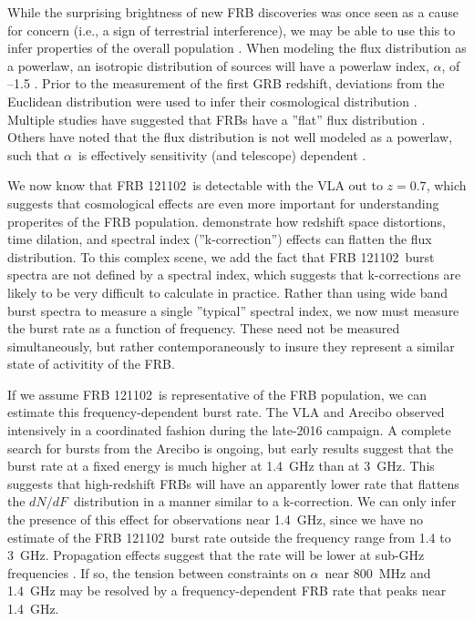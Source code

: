 \documentclass[twocolumn]{aastex61}
\newcommand{\frb}{FRB 121102}
\begin{document}
While the surprising brightness of new FRB discoveries was once seen as a cause for concern (i.e., a sign of terrestrial interference), we may be able to use this to infer properties of the overall population \citep{2007Sci...318..777L, 2016arXiv161105758R}. When modeling the flux distribution as a powerlaw, an isotropic distribution of sources will have a powerlaw index, $\alpha$, of --1.5 \citep[the ''Euclidean distribution'';][]{2016MNRAS.462..941L}. Prior to the measurement of the first GRB redshift, deviations from the Euclidean distribution were used to infer their cosmological distribution \citep[e.g., the $V/V_{\rm{max}}$\ test;][]{1992ApJ...388L..45M, 1995ApJ...453...25F}. Multiple studies have suggested that FRBs have a ''flat'' flux distribution \citep[$-0.5<\alpha<-0.9$;][]{2016ApJ...830...75V, 2016arXiv160206099L, 2016arXiv161100458L}. Others have noted that the flux distribution is not well modeled as a powerlaw, such that $\alpha$\ is effectively sensitivity (and telescope) dependent \citep{2016MNRAS.461..984O, 2017arXiv170208040C}.

We now know that \frb\ is detectable with the VLA out to $z=0.7$, which suggests that cosmological effects are even more important for understanding properites of the FRB population. \citet{2017arXiv170208040C} demonstrate how redshift space distortions, time dilation, and spectral index (''k-correction'') effects can flatten the flux distribution. To this complex scene, we add the fact that \frb\ burst spectra are not defined by a spectral index, which suggests that k-corrections are likely to be very difficult to calculate in practice. Rather than using wide band burst spectra to measure a single ''typical'' spectral index, we now must measure the burst rate as a function of frequency. These need not be measured simultaneously, but rather contemporaneously to insure they represent a similar state of activitity of the FRB.

If we assume \frb\ is representative of the FRB population, we can estimate this frequency-dependent burst rate. The VLA and Arecibo observed intensively in a coordinated fashion during the late-2016 campaign. A complete search for bursts from the Arecibo is ongoing, but early results suggest that the burst rate at a fixed energy is much higher at 1.4~GHz than at 3~GHz. This suggests that high-redshift FRBs will have an apparently lower rate that flattens the $dN/dF$\ distribution in a manner similar to a k-correction. We can only infer the presence of this effect for observations near 1.4~GHz, since we have no estimate of the \frb\ burst rate outside the frequency range from 1.4 to 3~GHz. Propagation effects suggest that the rate will be lower at sub-GHz frequencies \citep{2017MNRAS.465.2286R}. If so, the tension between constraints on $\alpha$\ near 800~MHz and 1.4~GHz may be resolved by a frequency-dependent FRB rate that peaks near 1.4~GHz.
\end{document}
